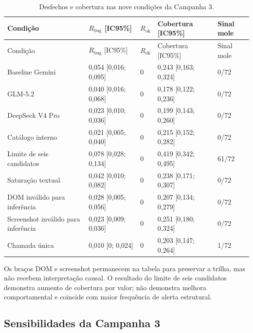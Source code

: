 \documentclass[11pt,a4paper]{article}
\newcommand{\Rbug}{\ensuremath{R_{\mathrm{bug}}}}
\newcommand{\Rok}{\ensuremath{R_{\mathrm{ok}}}}
\begin{document}
\begingroup
\footnotesize
\setlength{\tabcolsep}{3pt}
\begin{longtable}{@{}P{4.2cm}C{2.5cm}C{1.4cm}C{2.6cm}C{2.5cm}@{}}
\caption{Desfechos e cobertura nas nove condições da Campanha 3.}\label{tab:c3-all-arms}\\
\toprule
Condição & \Rbug{} [IC95\%] & \Rok{} & Cobertura [IC95\%] & Sinal mole \\
\midrule
\endfirsthead
\toprule
Condição & \Rbug{} [IC95\%] & \Rok{} & Cobertura [IC95\%] & Sinal mole \\
\midrule
\endhead
Baseline Gemini & 0,054 [0,016; 0,095] & 0 & 0,243 [0,163; 0,324] & 0/72 \\
GLM-5.2 & 0,040 [0,016; 0,068] & 0 & 0,178 [0,122; 0,236] & 0/72 \\
DeepSeek V4 Pro & 0,023 [0,010; 0,036] & 0 & 0,199 [0,143; 0,260] & 0/72 \\
Catálogo interno & 0,021 [0,005; 0,040] & 0 & 0,215 [0,152; 0,282] & 0/72 \\
Limite de seis candidatos & 0,078 [0,028; 0,134] & 0 & 0,419 [0,342; 0,495] & 61/72 \\
Saturação textual & 0,042 [0,010; 0,082] & 0 & 0,238 [0,171; 0,307] & 0/72 \\
DOM inválido para inferência & 0,028 [0,005; 0,056] & 0 & 0,207 [0,134; 0,279] & 0/72 \\
Screenshot inválido para inferência & 0,023 [0,009; 0,036] & 0 & 0,251 [0,180; 0,324] & 0/72 \\
Chamada única & 0,010 [0; 0,024] & 0 & 0,203 [0,147; 0,264] & 1/72 \\
\bottomrule
\end{longtable}
\endgroup

Os braços DOM e screenshot permanecem na tabela para preservar a trilha, mas não recebem interpretação causal. O resultado do limite de seis candidatos demonstra aumento de cobertura por valor; não demonstra melhora comportamental e coincide com maior frequência de alerta estrutural.

\subsection{Sensibilidades da Campanha 3}
\end{document}
